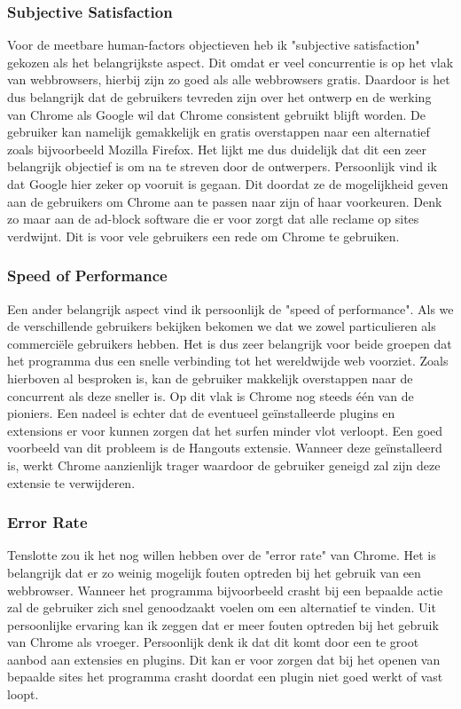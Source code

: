 \documentclass[12pt]{article}
\begin{document}
\subsubsection{Subjective Satisfaction}
Voor de meetbare human-factors objectieven heb ik "subjective satisfaction" gekozen als het belangrijkste aspect. Dit omdat er veel concurrentie is op het vlak van webbrowsers, hierbij zijn zo goed als alle webbrowsers gratis. Daardoor is het dus belangrijk dat de gebruikers tevreden zijn over het ontwerp en de werking van Chrome als Google wil dat Chrome consistent gebruikt blijft worden. De gebruiker kan namelijk gemakkelijk en gratis overstappen naar een alternatief zoals bijvoorbeeld Mozilla Firefox. Het lijkt me dus duidelijk dat dit een zeer belangrijk objectief is om na te streven door de ontwerpers. Persoonlijk vind ik dat Google hier zeker op vooruit is gegaan. Dit doordat ze de mogelijkheid geven aan de gebruikers om Chrome aan te passen naar zijn of haar voorkeuren. Denk zo maar aan de ad-block software die er voor zorgt dat alle reclame op sites verdwijnt. Dit is voor vele gebruikers een rede om Chrome te gebruiken. 
\subsubsection{Speed of Performance}
Een ander belangrijk aspect vind ik persoonlijk de "speed of performance". Als we de verschillende gebruikers bekijken bekomen we dat we zowel particulieren als commerci\"ele gebruikers hebben. Het is dus zeer belangrijk voor beide groepen dat het programma dus een snelle verbinding tot het wereldwijde web voorziet. Zoals hierboven al besproken is, kan de gebruiker makkelijk overstappen naar de concurrent als deze sneller is. Op dit vlak is Chrome nog steeds één van de pioniers. Een nadeel is echter dat de eventueel geïnstalleerde plugins en extensions er voor kunnen zorgen dat het surfen minder vlot verloopt. Een goed voorbeeld van dit probleem is de Hangouts extensie. Wanneer deze ge\"installeerd is, werkt Chrome aanzienlijk trager waardoor de gebruiker geneigd zal zijn deze extensie te verwijderen.
\subsubsection{Error Rate}
Tenslotte zou ik het nog willen hebben over de "error rate" van Chrome. Het is belangrijk dat er zo weinig mogelijk fouten optreden bij het gebruik van een webbrowser. Wanneer het programma bijvoorbeeld crasht bij een bepaalde actie zal de gebruiker zich snel genoodzaakt voelen om een alternatief te vinden. Uit persoonlijke ervaring kan ik zeggen dat er meer fouten optreden bij het gebruik van Chrome als vroeger. Persoonlijk denk ik dat dit komt door een te groot aanbod aan extensies en plugins. Dit kan er voor zorgen dat bij het openen van bepaalde sites het programma crasht doordat een plugin niet goed werkt of vast loopt.
\end{document}
